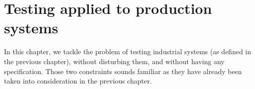 %
\chapter{Testing applied to production systems}
\label{sec:testing}

In this chapter, we tackle the problem of testing industrial
systems (as defined in the previous chapter), without disturbing
them, and without having any specification. Those two constraints
sounds familiar as they have already been taken into
consideration in the previous chapter.






